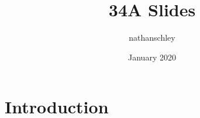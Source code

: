 \documentclass{article}
\title{34A Slides}
\author{nathanschley }
\date{January 2020}
\begin{document}
\maketitle

\section{Introduction}
\end{document}
